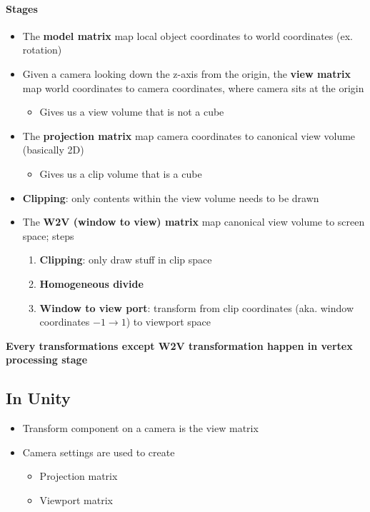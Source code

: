   \paragraph{Stages}
  \begin{itemize}
    \item The \textbf{model matrix} map local object coordinates to
    world coordinates (ex. rotation)
    \item Given a camera looking down the z-axis from the origin,
    the \textbf{view matrix} map world coordinates to camera coordinates,
    where camera sits at the origin
    \begin{itemize}
      \item Gives us a view volume that is not a cube
    \end{itemize}

    \item The \textbf{projection matrix} map camera coordinates to canonical
    view volume (basically 2D)
    \begin{itemize}
      \item Gives us a clip volume that is a cube
    \end{itemize}

    \item \textbf{Clipping}: only contents within the view volume needs to be
    drawn
    \item The \textbf{W2V (window to view) matrix} map canonical view volume
    to screen space; steps
    \begin{enumerate}
      \item \textbf{Clipping}: only draw stuff in clip space
      \item \textbf{Homogeneous divide}
      \item \textbf{Window to view port}: transform from clip coordinates
      (aka. window coordinates $ -1 \to 1 $) to viewport space
    \end{enumerate}
  \end{itemize}

  \textbf{Every transformations except W2V transformation happen in vertex
  processing stage}

  \subsection{In Unity}

    \begin{itemize}
      \item Transform component on a camera is the view matrix
      \item Camera settings are used to create
      \begin{itemize}
        \item Projection matrix
        \item Viewport matrix
      \end{itemize}
    \end{itemize}

